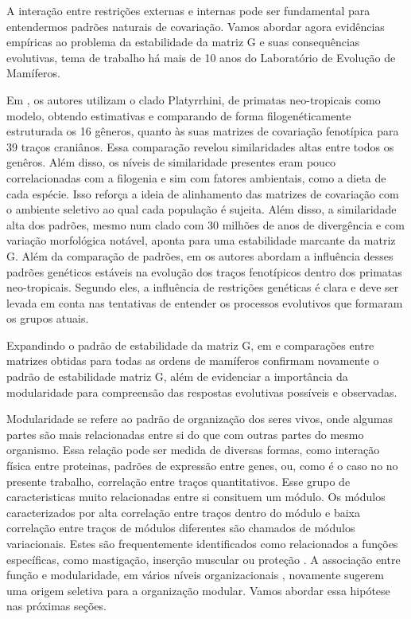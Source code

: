 \documentclass[a4paper, 12pt, titlepage, onecolumn]{article}
\numberwithin{equation}{section}
\numberwithin{table}{section}
\begin{document}
A interação entre restrições externas e internas pode ser fundamental
para entendermos padrões naturais de covariação. Vamos abordar agora
evidências empíricas ao problema da estabilidade da matriz G e suas
consequências evolutivas, tema de trabalho há mais de 10 anos do
Laboratório de Evolução de Mamíferos.

Em \cite{Marroig2001}, os autores utilizam o clado Platyrrhini, de
primatas neo-tropicais como modelo, obtendo estimativas e comparando de
forma filogenéticamente estruturada os 16 gêneros, quanto às suas
matrizes de covariação fenotípica para 39 traços craniânos. Essa comparação revelou
similaridades altas entre todos os genêros. Além disso, os níveis de
similaridade presentes eram pouco correlacionadas com a filogenia e sim com fatores
ambientais, como a dieta de cada espécie. Isso reforça a ideia de
alinhamento das matrizes de covariação com o ambiente seletivo ao qual cada
população é sujeita. Além disso, a similaridade alta dos padrões, mesmo num clado com
30 milhões de anos de divergência e com variação morfológica notável,
aponta para uma estabilidade marcante da matriz G. Além da comparação de
padrões, em \cite{Marroig2005, Marroig2010} os autores abordam a
influência desses padrões genéticos estáveis na evolução dos traços
fenotípicos dentro dos primatas neo-tropicais. Segundo eles, a influência de
restrições genéticas é clara e deve ser levada em conta nas tentativas
de entender os processos evolutivos que formaram os grupos atuais.

Expandindo o padrão de estabilidade da matriz G, em \cite{Porto2008} e
\cite{Marroig2009} comparações entre matrizes obtidas para todas as
ordens de mamíferos confirmam novamente o padrão de estabilidade matriz
G, além de evidenciar a importância da modularidade para compreensão das
respostas evolutivas possíveis e observadas. 

Modularidade se refere ao padrão de organização dos seres vivos, onde
algumas partes são mais relacionadas entre si do que com outras partes
do mesmo organismo. Essa relação pode ser medida de diversas formas,
como interação física entre proteinas, padrões de expressão entre genes,
ou, como é o caso no no presente trabalho, correlação entre traços
quantitativos. Esse grupo de caracteristicas muito relacionadas entre
si consituem um módulo. Os módulos caracterizados por alta correlação
entre traços dentro do módulo e baixa correlação entre traços de módulos
diferentes são chamados de módulos variacionais. Estes são frequentemente
identificados como relacionados a funções específicas, como mastigação,
inserção muscular ou proteção \citep{Cheverud1997}. A associação entre
função e modularidade, em vários níveis organizacionais
\citep{Costanzo2010}, novamente sugerem uma origem seletiva para a
organização modular. Vamos abordar essa hipótese nas próximas seções.
\end{document}
